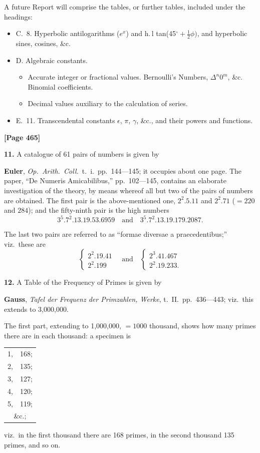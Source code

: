 \documentclass[11pt,a4paper]{article}
\begin{document}
A future Report will comprise the tables, or further tables, included under the headings:
\begin{itemize}[nosep]
\item C.\ 8. Hyperbolic antilogarithms ($e^{x}$) and h.\,l tan(45$^{\circ} + \frac{1}{2}\phi)$, and hyperbolic sines, cosines, \&c.
\item D. Algebraic constants.
\begin{itemize}[nosep]
\item[9.] Accurate integer or fractional values. Bernoulli's Numbers, $\Delta^{n} 0^{m}$, \&c. Binomial coefficients.
\item[10.] Decimal values auxiliary to the calculation of series.
\end{itemize}
\item E.\ 11. Transcendental constants $\epsilon$, $\pi$, $\gamma$, \&c., and their powers and functions.
\end{itemize}


\newpage
\textbf{[Page 465]}

\textbf{11.} A catalogue of 61 pairs of numbers is given by

\quad\textbf{Euler}, \textit{Op.\ Arith.\ Coll.}\ t.\ i.\ pp.\ 144---145; it occupies about one page. The paper, ``De Numeris Amicabilibus,'' pp.\ 102---145, contains an elaborate investigation of the theory, by means whereof all but two of the pairs of numbers are obtained. The first pair is the above-mentioned one, $2^{2}.5.11$ and $2^{2}.71$ ($= 220$ and $284$); and the fifty-ninth pair is the high numbers
\[3^{5}.7^{2}.13.19.53.6959 \quad \text{and} \quad 3^{5}.7^{2}.13.19.179.2087.\]

The last two pairs are referred to as ``formae diversae a praecedentibus;'' viz.\ these are
\[\left\{\begin{array}{l}2^{2}.19.41 \\ 2^{2}.199\end{array}\right. \quad \text{and} \quad \left\{\begin{array}{l}2^{3}.41.467 \\ 2^{2}.19.233.\end{array}\right.\]

\textbf{12.} A Table of the Frequency of Primes is given by

\quad\textbf{Gauss}, \textit{Tafel der Frequenz der Primzahlen, Werke}, t.\ II.\ pp.\ 436---443; viz.\ this extends to 3,000,000.

The first part, extending to 1,000,000, $= 1000$ thousand, shows how many primes there are in each thousand: a specimen is
\begin{center}
\begin{tabular}{r@{,\quad}r}
1, & 168; \\
2, & 135; \\
3, & 127; \\
4, & 120; \\
5, & 119; \\
\multicolumn{2}{c}{\&c.;}
\end{tabular}
\end{center}
viz.\ in the first thousand there are 168 primes, in the second thousand 135 primes, and so on.
\end{document}
